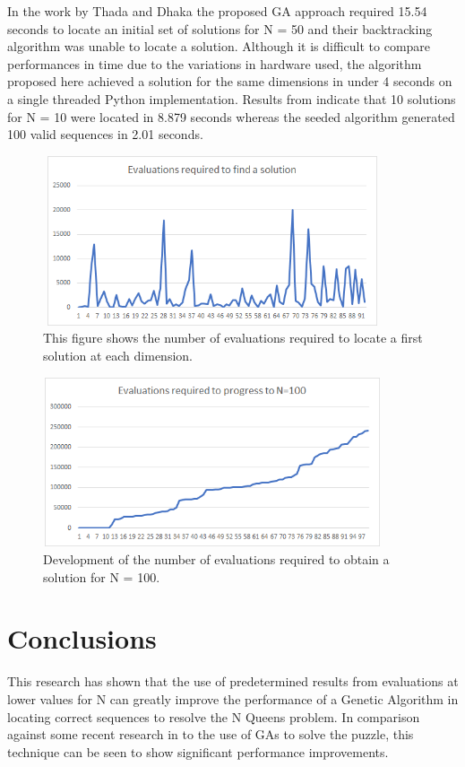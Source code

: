 \documentclass[conference]{IEEEtran}
\begin{document}
In the work by Thada and Dhaka \cite{Performance} the proposed GA approach required 15.54 seconds to locate an initial set of solutions for N = 50 and their backtracking algorithm was unable to locate a solution. Although it is difficult to compare performances in time due to the variations in hardware used, the algorithm proposed here achieved a solution for the same dimensions in under 4 seconds on a single threaded Python implementation. Results from \cite{Performance} indicate that 10 solutions for N = 10 were located in 8.879 seconds whereas the seeded algorithm generated 100 valid sequences in 2.01 seconds.

\begin{figure}[!htbp]
	\centering	
	\includegraphics[width=10cm, height=5cm]{EvaluationsPerDimension}
	\caption{This figure shows the number of evaluations required to locate a first solution at each dimension.}
\end{figure}

\begin{figure}[!htbp]
	\centering	
	\includegraphics[width=10cm, height=5cm]{EvaluationProgress}
	\caption{Development of the number of evaluations required to obtain a solution for N = 100.}
\end{figure}

\section{Conclusions}
This research has shown that the use of predetermined results from evaluations at lower values for N can greatly improve the performance of a Genetic Algorithm in locating correct sequences to resolve the N Queens problem. In comparison against some recent research in to the use of GAs to solve the puzzle, this technique can be seen to show significant performance improvements. 
\end{document}
